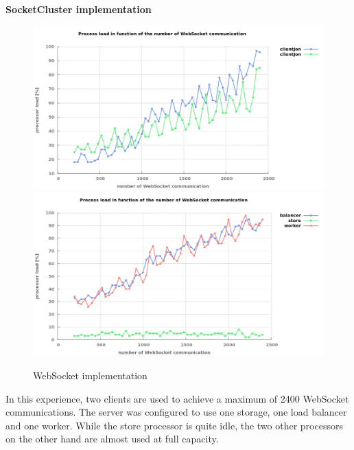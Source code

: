 \textbf{SocketCluster implementation}

\begin{figure}[H]
	\centering
		\includegraphics[width=.9\textwidth]{./Figures/WS_client_comparaison.png}
		\includegraphics[width=.9\textwidth]{./Figures/WS_server_comparaison.png}
	\caption[WebSocket implementation]{WebSocket implementation}
	\label{fig:WS_comparaison}
\end{figure}

In this experience, two clients are used to achieve a maximum of 2400 WebSocket
communications.  The server was configured to use one storage, one load
balancer and one worker. While the store processor is quite idle, the two other
processors on the other hand are almost used at full capacity.

